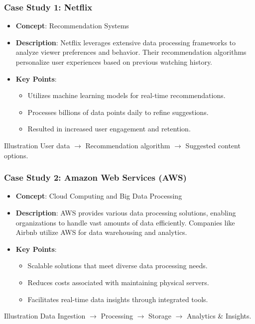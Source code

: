 \documentclass{beamer}
\begin{document}
\begin{frame}[fragile]
    \frametitle{Case Study 1: Netflix}
    \begin{itemize}
        \item \textbf{Concept}: Recommendation Systems
        \item \textbf{Description}: Netflix leverages extensive data processing frameworks to analyze viewer preferences and behavior. Their recommendation algorithms personalize user experiences based on previous watching history.
        \item \textbf{Key Points}:
        \begin{itemize}
            \item Utilizes machine learning models for real-time recommendations.
            \item Processes billions of data points daily to refine suggestions.
            \item Resulted in increased user engagement and retention.
        \end{itemize}
    \end{itemize}
    \begin{block}{Illustration}
        User data $\rightarrow$ Recommendation algorithm $\rightarrow$ Suggested content options.
    \end{block}
\end{frame}

\begin{frame}[fragile]
    \frametitle{Case Study 2: Amazon Web Services (AWS)}
    \begin{itemize}
        \item \textbf{Concept}: Cloud Computing and Big Data Processing
        \item \textbf{Description}: AWS provides various data processing solutions, enabling organizations to handle vast amounts of data efficiently. Companies like Airbnb utilize AWS for data warehousing and analytics.
        \item \textbf{Key Points}:
        \begin{itemize}
            \item Scalable solutions that meet diverse data processing needs.
            \item Reduces costs associated with maintaining physical servers.
            \item Facilitates real-time data insights through integrated tools.
        \end{itemize}
    \end{itemize}
    \begin{block}{Illustration}
        Data Ingestion $\rightarrow$ Processing $\rightarrow$ Storage $\rightarrow$ Analytics \& Insights.
    \end{block}
\end{frame}
\end{document}
